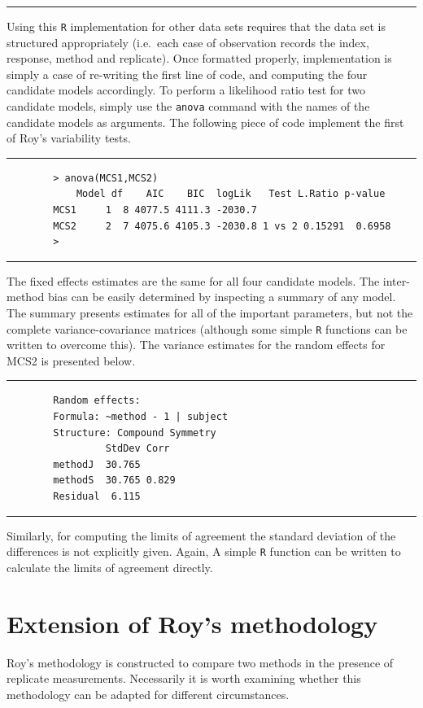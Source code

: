 \documentclass[12pt, a4paper]{report}
\theoremstyle{plain}
\theoremstyle{definition}
\theoremstyle{remark}
\begin{document}
\hrule
\vspace{1cm}
Using this \texttt{R} implementation for other data sets requires that the data set is structured appropriately (i.e.\ each case of observation records the index, response, method and replicate). Once formatted properly, implementation is simply a case of re-writing the first line of code, and computing the four candidate models accordingly.
\newpage
To perform a likelihood ratio test for two candidate models, simply use the \texttt{anova} command with the names of the candidate models as arguments. The following piece of code implement the first of Roy's variability tests.
\\
\hrule
\begin{verbatim}
        > anova(MCS1,MCS2)
            Model df    AIC    BIC  logLik   Test L.Ratio p-value
        MCS1     1  8 4077.5 4111.3 -2030.7
        MCS2     2  7 4075.6 4105.3 -2030.8 1 vs 2 0.15291  0.6958
        >
\end{verbatim}
\hrule
\vspace{1cm}
The fixed effects estimates are the same for all four candidate models. The inter-method bias can be easily determined by inspecting a summary of any model. The summary presents estimates for all of the important parameters, but not the complete variance-covariance matrices (although some simple \texttt{R} functions can be written to overcome this). The variance estimates for the random effects for MCS2 is presented below.
\\
\hrule
\begin{verbatim}
        Random effects:
        Formula: ~method - 1 | subject
        Structure: Compound Symmetry
                 StdDev Corr
        methodJ  30.765
        methodS  30.765 0.829
        Residual  6.115
\end{verbatim}
\hrule
\vspace{1cm}
Similarly, for computing the limits of agreement the standard deviation of the differences is not explicitly given. Again, A simple \texttt{R} function can be written to calculate the limits of agreement directly.

\newpage
\section{Extension of Roy's methodology}
Roy's methodology is constructed to compare two methods in the presence of replicate measurements. Necessarily it is worth examining whether this methodology can be adapted for different circumstances.
\end{document}
